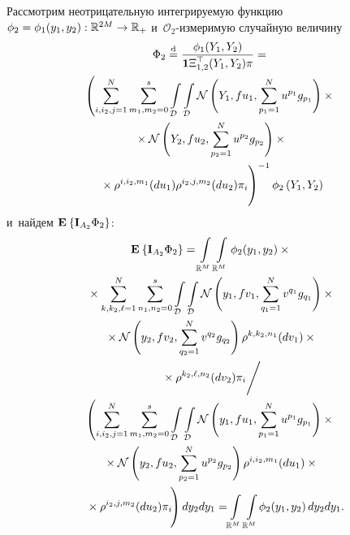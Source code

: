 \begin{multicols}{2}
 Рассмотрим неотрицательную интегрируемую функцию $\phi_2\hm=\phi_1(y_1,y_2): 
 \mathbb{R}^{2M}\hm \to \mathbb{R}_+$ и~$\mathcal{O}_2$-из\-ме\-ри\-мую случайную величину
  \begin{multline*}
 \Phi_2 \eqd \fr{\phi_1(Y_1,Y_2)}{\mathbf{1}\Xi_{1,2}^{\top}(Y_1,Y_2)\pi}= {}
   \\
    \left(
  \sum\limits_{i,i_2,j=1}^{N}\sum\limits_{m_1,m_2=0}^{s}
  \int\limits_{\mathcal{D}}\int\limits_{\mathcal{D}}
  \mathcal{N}\left(Y_1,fu_1,\sum\limits_{p_1=1}^Nu^{p_1}g_{p_1}\right)\times{}\right.\\
{}\times
  \mathcal{N}\left(Y_2,fu_2,\sum\limits_{p_2=1}^Nu^{p_2}g_{p_2}\right)\times{}\\
    \left.{}\times{}
  \rho^{i,i_2,m_1}(du_1)\rho^{i_2,j,m_2}(du_2)
  \pi_i
  \vphantom{\int\limits_{\mathcal{D}}}
  \right)^{-1} \phi_2\left(Y_1,Y_2\right)
 \label{eq:phi_2}
 \end{multline*}
 и~найдем $\mathbf{E}_{  }\left\{ \mathop{\mathbf{I}_{A_2}\Phi_2} \right\}$:
 \begin{multline*}
 \me{}{\mathbf{I}_{A_2}\Phi_2} =
 \int\limits_{\mathbb{R}^M}
 \int\limits_{\mathbb{R}^M}
 \phi_2(y_1,y_2)\times{}\\
{} \times
  \sum\limits_{k,k_2,\ell=1}^{N}\sum\limits_{n_1,n_2=0}^{s}
  \int\limits_{\mathcal{D}}\int\limits_{\mathcal{D}}
  \mathcal{N}\left(y_1,fv_1,\sum\limits_{q_1=1}^Nv^{q_1} g_{q_1}\right)\times{}\\
  {}\times
  \mathcal{N}\left(y_2,fv_2,\sum\limits_{q_2=1}^Nv^{q_2} g_{q_2}\right)
  \rho^{k,k_2,n_1}(dv_1)\times{}\\
  {}\times \rho^{k_2,\ell,n_2}(dv_2)
  \pi_i 
\Bigg/ \\
\left( 
\sum\limits_{i,i_2,j=1}^{N}\sum\limits_{m_1,m_2=0}^{s}
 \int\limits_{\mathcal{D}}\int\limits_{\mathcal{D}}
  \mathcal{N}\left(y_1,fu_1,\sum\limits_{p_1=1}^Nu^{p_1} g_{p_1}\right)\times{}\right.\\
{}\times  \mathcal{N}\left(y_2,fu_2,\sum\limits_{p_2=1}^Nu^{p_2} g_{p_2}\right)
  \rho^{i,i_2,m_1}(du_1)\times{}\\
 \! \left.{}\times\rho^{i_2,j,m_2}(du_2)
  \pi_i
  \vphantom{\int\limits_{\mathcal{D}}}
  \!\right) dy_2 dy_1
=  \!\int\limits_{\mathbb{R}^M}
 \int\limits_{\mathbb{R}^M}\!
 \phi_2(y_1,y_2)\,
 dy_2 dy_1.\hspace*{-7.28978pt}
 \end{multline*}
 
 
 

\end{multicols}
